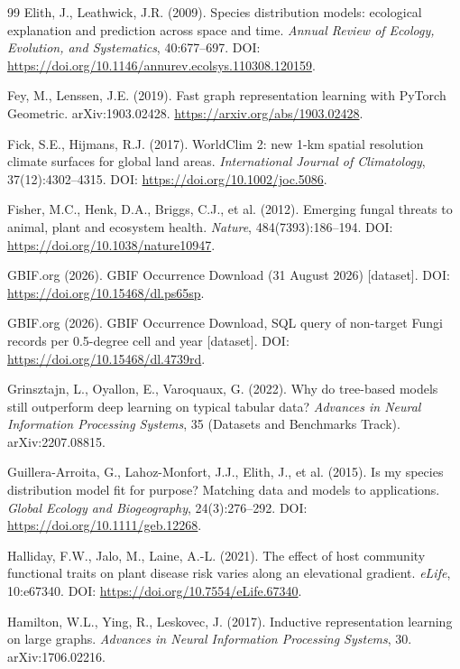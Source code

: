 \documentclass[a4paper,fleqn]{cas-sc}
\begin{document}
\begin{thebibliography}{99}
 Elith, J., Leathwick, J.R. (2009). Species distribution models: ecological explanation and prediction across space and time. \textit{Annual Review of Ecology, Evolution, and Systematics}, 40:677--697. DOI: \url{https://doi.org/10.1146/annurev.ecolsys.110308.120159}.

 Fey, M., Lenssen, J.E. (2019). Fast graph representation learning with PyTorch Geometric. arXiv:1903.02428. \url{https://arxiv.org/abs/1903.02428}.

 Fick, S.E., Hijmans, R.J. (2017). WorldClim 2: new 1-km spatial resolution climate surfaces for global land areas. \textit{International Journal of Climatology}, 37(12):4302--4315. DOI: \url{https://doi.org/10.1002/joc.5086}.

 Fisher, M.C., Henk, D.A., Briggs, C.J., et al. (2012). Emerging fungal threats to animal, plant and ecosystem health. \textit{Nature}, 484(7393):186--194. DOI: \url{https://doi.org/10.1038/nature10947}.

 GBIF.org (2026). GBIF Occurrence Download (31 August 2026) [dataset]. DOI: \url{https://doi.org/10.15468/dl.ps65sp}.

 GBIF.org (2026). GBIF Occurrence Download, SQL query of non-target Fungi records per 0.5-degree cell and year [dataset]. DOI: \url{https://doi.org/10.15468/dl.4739rd}.

 Grinsztajn, L., Oyallon, E., Varoquaux, G. (2022). Why do tree-based models still outperform deep learning on typical tabular data? \textit{Advances in Neural Information Processing Systems}, 35 (Datasets and Benchmarks Track). arXiv:2207.08815.

 Guillera-Arroita, G., Lahoz-Monfort, J.J., Elith, J., et al. (2015). Is my species distribution model fit for purpose? Matching data and models to applications. \textit{Global Ecology and Biogeography}, 24(3):276--292. DOI: \url{https://doi.org/10.1111/geb.12268}.

 Halliday, F.W., Jalo, M., Laine, A.-L. (2021). The effect of host community functional traits on plant disease risk varies along an elevational gradient. \textit{eLife}, 10:e67340. DOI: \url{https://doi.org/10.7554/eLife.67340}.

 Hamilton, W.L., Ying, R., Leskovec, J. (2017). Inductive representation learning on large graphs. \textit{Advances in Neural Information Processing Systems}, 30. arXiv:1706.02216.


\end{thebibliography}
\end{document}
